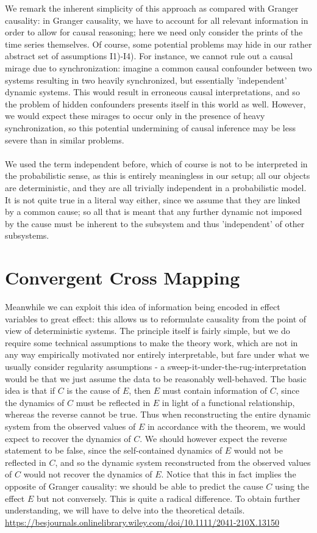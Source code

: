\documentclass[11pt, a4paper]{memoir}
\theoremstyle{break}
\theoremstyle{break}
\theoremstyle{nonumberplain}
\begin{document}
We remark the inherent simplicity of this approach as compared with Granger causality: in Granger causality, we have to account for all relevant information in order to allow for causal reasoning; here we need only consider the prints of the time series themselves. Of course, some potential problems may hide in our rather abstract set of assumptions I1)-I4). For instance, we cannot rule out a causal mirage due to synchronization: imagine a common causal confounder between two systems resulting in two heavily synchronized, but essentially 'independent' dynamic systems. This would result in erroneous causal interpretations, and so the problem of hidden confounders presents itself in this world as well. However, we would expect these mirages to occur only in the presence of heavy synchronization, so this potential undermining of causal inference may be less severe than in similar problems.\\\\ 
We used the term independent before, which of course is not to be interpreted in the probabilistic sense, as this is entirely meaningless in our setup; all our objects are deterministic, and they are all trivially independent in a probabilistic model. It is not quite true in a literal way either, since we assume that they are linked by a common cause; so all  that is meant that any further dynamic not imposed by the cause must be inherent to the subsystem and thus 'independent' of other subsystems.

\chapter{Convergent Cross Mapping}
Meanwhile we can exploit this idea of information being encoded in effect variables to great effect: this allows us to reformulate causality from the point of view of deterministic systems. The principle itself is fairly simple, but we do require some technical assumptions to make the theory work, which are not in any way empirically motivated nor entirely interpretable, but fare under what we usually consider regularity assumptions - a sweep-it-under-the-rug-interpretation would be that we just assume the data to be reasonably well-behaved. The basic idea is that if $C$ is the cause of $E$, then $E$ must contain information of $C$, since the dynamics of $C$ must be reflected in $E$ in light of a functional relationship, whereas the reverse cannot be true. Thus when reconstructing the entire dynamic system from the observed values of $E$ in accordance with the theorem, we would expect to recover the dynamics of $C$. We should however expect the reverse statement to be false, since the self-contained dynamics of $E$ would not be reflected in $C$, and so the dynamic system reconstructed from the observed values of $C$ would not recover the dynamics of $E$. Notice that this in fact implies the opposite of Granger causality: we should be able to predict the cause $C$ using the effect $E$ but not conversely. This is quite a radical difference. To obtain further understanding, we will have to delve into the theoretical details. 
\url{https://besjournals.onlinelibrary.wiley.com/doi/10.1111/2041-210X.13150}
\end{document}
